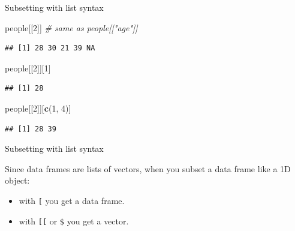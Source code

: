 \documentclass[ignorenonframetext,]{beamer}
\newenvironment{Shaded}{\begin{snugshade}}{\end{snugshade}}
\newcommand{\CommentTok}[1]{\textcolor[rgb]{0.56,0.35,0.01}{\textit{#1}}}
\newcommand{\DecValTok}[1]{\textcolor[rgb]{0.00,0.00,0.81}{#1}}
\newcommand{\KeywordTok}[1]{\textcolor[rgb]{0.13,0.29,0.53}{\textbf{#1}}}
\newcommand{\NormalTok}[1]{#1}
\providecommand{\tightlist}{%
  \setlength{\itemsep}{0pt}\setlength{\parskip}{0pt}}
\begin{document}
\begin{frame}[fragile]{Subsetting with list syntax}
\protect\hypertarget{subsetting-with-list-syntax-5}{}

\begin{Shaded}
\begin{Highlighting}[]
\NormalTok{people[[}\DecValTok{2}\NormalTok{]] }\CommentTok{# same as people[["age"]]}
\end{Highlighting}
\end{Shaded}

\begin{verbatim}
## [1] 28 30 21 39 NA
\end{verbatim}

\begin{Shaded}
\begin{Highlighting}[]
\NormalTok{people[[}\DecValTok{2}\NormalTok{]][}\DecValTok{1}\NormalTok{]}
\end{Highlighting}
\end{Shaded}

\begin{verbatim}
## [1] 28
\end{verbatim}

\begin{Shaded}
\begin{Highlighting}[]
\NormalTok{people[[}\DecValTok{2}\NormalTok{]][}\KeywordTok{c}\NormalTok{(}\DecValTok{1}\NormalTok{, }\DecValTok{4}\NormalTok{)]}
\end{Highlighting}
\end{Shaded}

\begin{verbatim}
## [1] 28 39
\end{verbatim}

\end{frame}

\begin{frame}[fragile]{Subsetting with list syntax}
\protect\hypertarget{subsetting-with-list-syntax-6}{}

Since data frames are lists of vectors, when you subset a data frame
like a 1D object:

\begin{itemize}
\tightlist
\item
  with \texttt{{[}} you get a data frame.
\item
  with \texttt{{[}{[}} or \texttt{\$} you get a vector.
\end{itemize}

\end{frame}
\end{document}
